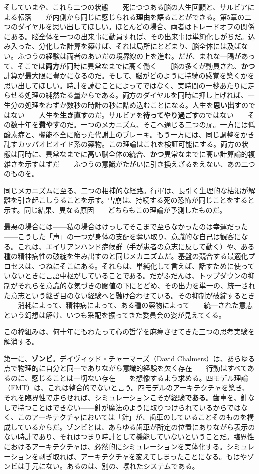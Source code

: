 \documentclass[11pt, twoside, openright]{book}
\begin{document}
そしていまや、これら二つの状態------死につつある脳の人生回顧と、サルビアによる転落------が内側から同じに感じられる\textbf{理由}を語ることができる。第5章の二つのダイヤルを思い出してほしい。ほとんどの場合、両者はトレードオフの関係にある。脳全体を一つの出来事に動員すれば、その出来事は単純化しがちだ。込み入った、分化した計算を築けば、それは局所にとどまり、脳全体には及ばない。ふつうの経験は両者のあいだの境界線の上を進む。だが、まれな一隅があって、そこでは\textbf{両方}が同時に異常なまでに高く働く------脳の多くが動員され、\textbf{かつ}計算が最大限に豊かになるのだ。そして、脳がどのように持続の感覚を築くかを思い出してほしい。時計を読むことによってではなく、実時間の一秒あたりに走らせる処理の純然たる量からである。両方のダイヤルを同時に押し上げれば、一生分の処理をわずか数秒の時計の秒に詰め込むことになる。人生を\textbf{思い出す}のではない------人生を\textbf{生き直す}のだ。サルビアを\textbf{待ってやり過ごす}のではない------その数十年を\textbf{費やす}のだ。一つのメカニズム、そこへ通じる二つの扉。一方には低酸素症と、機能不全に陥った代謝上のブレーキ。もう一方には、同じ調整をかき乱すカッパオピオイド系の薬物。この理論はこれを検証可能にする。両方の状態は同時に、異常なまでに高い脳全体の統合、\textbf{かつ}異常なまでに高い計算論的複雑さを示すはずだ------ふつうの意識がたがいに引き換えざるをえない、あの二つのものを。

同じメカニズムに至る、二つの相補的な経路。行軍は、長引く生理的な枯渇が解離を引き起こしうることを示す。雪崩は、持続する死の恐怖が同じことをすると示す。同じ結果、異なる原因------どちらもこの理論が予測したものだ。

最悪の場合には------私の場合はけっしてそこまで至らなかったのは幸運だった------こうした「声」の一つが身体の支配を奪い取り、意識的な自己は観客になる。これは、エイリアンハンド症候群（手が患者の意志に反して動く）や、ある種の精神病性の破綻を生み出すのと同じメカニズムだ。基盤の競合する最適化プロセスは、つねにそこにある。それらは、単純化して言えば、話すために使っていないときに言語中枢がしていることである。だがふだんは、トップダウンの抑制がそれらを意識的な気づきの閾値の下にとどめ、その出力を単一の、統一された意志という継ぎ目のない経験へと融け合わせている。その抑制が破綻するとき------消耗によって、精神病によって、ある種の薬物によって------統一された意志という幻想は解け、いつも采配を振ってきた委員会の姿が見えてくる。

この枠組みは、何十年にもわたって心の哲学を麻痺させてきた三つの思考実験を解消する。

第一に、\textbf{ゾンビ}。デイヴィッド・チャーマーズ（David Chalmers）は、あらゆる点で物理的に自分と同一でありながら意識的経験を欠く存在------行動はすべてあるのに、感じることは一切ない存在------を想像するよう求める。四モデル理論（FMT）は、これは整合的でないと言う。四モデルのアーキテクチャを築き、それを臨界性で走らせれば、シミュレーションこそが経験\textbf{である}。歯車を、針なしで持つことはできない------針が魔法のように取りつけられているからではなく、このアーキテクチャにおいては「針」が、歯車のしていることそのものを構成しているからだ。ゾンビとは、あらゆる歯車が所定の位置にありながら表示のない時計であり、それはつまり時計として機能していないということだ。臨界性におけるアーキテクチャは、必然的にシミュレーションを実体化する。シミュレーションを剥ぎ取れば、アーキテクチャを変えてしまったことになる。もはやゾンビは手元にない。あるのは、別の、壊れたシステムである。
\end{document}
